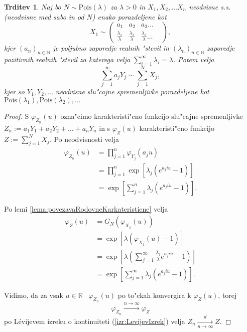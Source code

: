 \documentclass[12pt, a4paper, reqno]{amsart}
\theoremstyle{definition}
\theoremstyle{plain}
\newtheorem{trditev}[definicija]{Trditev}
\newcommand{\R}{\mathbb{R}}
\newcommand{\N}{\mathbb{N}}
\newcommand{\1}{\mathds{1}}
\newcommand{\Pois}[1]{\text{Pois}(#1)}
\begin{document}
    \begin{trditev}
        Naj bo $N\sim \Pois{\lambda}$  za $\lambda >0$ in $X_1, X_2, \dots X_n$ neodvisne s.s. (neodvisne 
        med sabo in od $N$) enako porazdeljene kot
        $$ X_1\sim
        \begin{pmatrix}
            a_1 & a_2 & a_3  \dots & \\
            \tfrac{\lambda_1}{\lambda} & \tfrac{\lambda_2}{\lambda} & \tfrac{\lambda_3}{\lambda} \dots & 
        \end{pmatrix},
        $$
        kjer $(a_n)_{n\in\N}$ je poljubno zaporedje realnih "stevil in 
        $(\lambda_n)_{n\in\N}$ zaporedje pozitivnih realnih "stevil za katerega velja 
        ${\sum_{i=1}^\infty\lambda_i = \lambda}$.
        Potem velja 
        \begin{equation*}
            \sum_{j=1}^\infty a_jY_j \sim \sum_{j=1}^NX_j,
        \end{equation*}
        kjer so $Y_1,Y_2,  \dots$ neodvisne slu"cajne spremenljivke porazdeljene kot \\
        $\Pois{\lambda_1},\Pois{\lambda_2}, \dots$
        \label{trd:NXjeEnakoaY}
    \end{trditev}

    \begin{proof}
        S $\varphi_{Z_n}(u)$ ozna"cimo karakteristi"cno funkcijo slu"cajne spremenljivke 
        $Z_n := a_1Y_1 + a_2Y_2 + \dots + a_nY_n$ in s $\varphi_{Z}(u)$ karakteristi"cno funkcijo
        $Z:= \sum_{j=1}^{N}X_j$. Po neodvisnosti velja
        \begin{align*}
            \varphi_{Z_n}(u) 
                    &= \prod_{j=1}^{n}\varphi_{Y_j}(a_ju)\\
                    &= \prod_{j=1}^{n}\exp\left[\lambda_j\left(e^{a_j i u} - 1\right)\right] \\
                    &= \exp\left[\sum_{j=1}^{n}\lambda_j\left(e^{a_j i u} - 1\right)\right].
        \end{align*}

        \noindent
        Po lemi \ref{lema:povezavaRodovneKarkateristicne} velja
        \begin{align*}
            \varphi_{Z}(u) 
                    &= G_N\left(\varphi_{X_1}(u)\right) \\
                    &= \exp\left[\lambda\left(\varphi_{X_1}(u) - 1\right)\right] \\
                    & = \exp\left[\lambda\left(\sum_{j=1}^\infty\frac{\lambda_j}{\lambda}e^{a_jiu} - 1\right)\right]\\
                    &= \exp\left[\sum_{j=1}^{\infty}\lambda_j\left(e^{a_j i u} - 1\right)\right].
        \end{align*}

        \noindent 
        Vidimo, da za vsak $u\in\R$ \ $\varphi_{Z_n}(u)$ po to"ckah konvergira k $\varphi_{Z}(u)$, torej
        \begin{equation*}
            \varphi_{Z_n} \xrightarrow{n\to\infty}\varphi_Z
        \end{equation*}
        po Lévijevem izreku o kontinuiteti (\ref{izr:LevijevIzrek}) velja $Z_n \xrightarrow[n\to\infty]{d}Z$.
    \end{proof}
\end{document}
